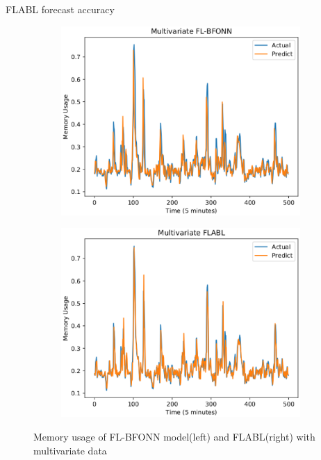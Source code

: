 \documentclass{beamer}
\begin{document}
\begin{frame}{FLABL forecast accuracy}
	\begin{figure}
		\centering
		\begin{subfigure}{0.5\textwidth}
			\centering
			\includegraphics[width=1.0\linewidth]{true/multi_ram_flbfonn.eps}
			\label{fig:sub11}
		\end{subfigure}%
		\begin{subfigure}{.5\textwidth}
			\centering
			\includegraphics[width=1.0\linewidth]{true/multi_ram_flabl.eps}
			\label{fig:sub21}
		\end{subfigure}%
		\caption{Memory usage of FL-BFONN model(left) and FLABL(right) with multivariate data}
		\label{fig:cpu_predict}
	\end{figure}
\end{frame}
\end{document}
